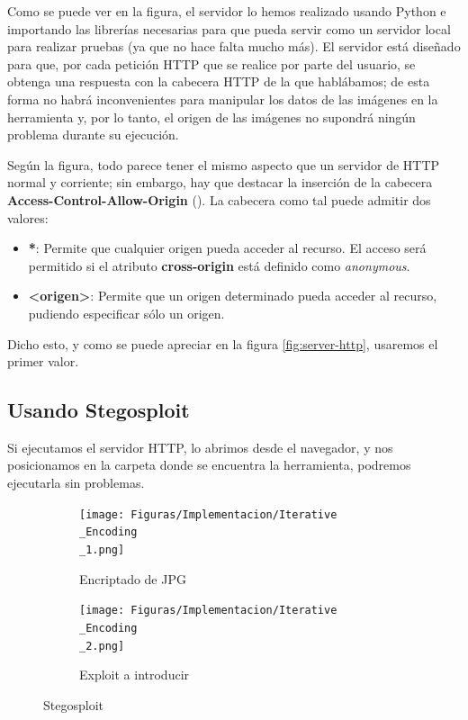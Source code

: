 Como se puede ver en la figura, el servidor lo hemos realizado usando Python e importando las librerías necesarias para que pueda servir como un servidor local para realizar pruebas (ya que no hace falta mucho más). El servidor está diseñado para que, por cada petición HTTP que se realice por parte del usuario, se obtenga una respuesta con la cabecera HTTP de la que hablábamos; de esta forma no habrá inconvenientes para manipular los datos de las imágenes en la herramienta y, por lo tanto, el origen de las imágenes no supondrá ningún problema durante su ejecución.

Según la figura, todo parece tener el mismo aspecto que un servidor de HTTP normal y corriente; sin embargo, hay que destacar la inserción de la cabecera \textbf{Access-Control-Allow-Origin} (\cite{server-http}). La cabecera como tal puede admitir dos valores:

\begin{itemize}
\item \textbf{*}: Permite que cualquier origen pueda acceder al recurso. El acceso será permitido si el atributo \textbf{cross-origin} está definido como \textit{anonymous}.
\item \textbf{<origen>}: Permite que un origen determinado pueda acceder al recurso, pudiendo especificar sólo un origen.
\end{itemize}

Dicho esto, y como se puede apreciar en la figura \ref{fig:server-http}, usaremos el primer valor.

\subsection{Usando Stegosploit}

Si ejecutamos el servidor HTTP, lo abrimos desde el navegador, y nos posicionamos en la carpeta donde se encuentra la herramienta, podremos ejecutarla sin problemas.

\begin{figure}[H]
  \centering
  \begin{subfigure}[H]{0.30\linewidth}
  	\texttt{[image: Figuras/Implementacion/Iterative\\\_Encoding\\\_1.png]}
  	\label{fig:iter-encod}
  	\caption{Encriptado de JPG}
  \end{subfigure}
  \begin{subfigure}[H]{0.45\linewidth}
  	\texttt{[image: Figuras/Implementacion/Iterative\\\_Encoding\\\_2.png]}
  	\label{fig:iter-encod-2}
  	\caption{Exploit a introducir}
  \end{subfigure}
  \caption{Stegosploit}
\end{figure}

